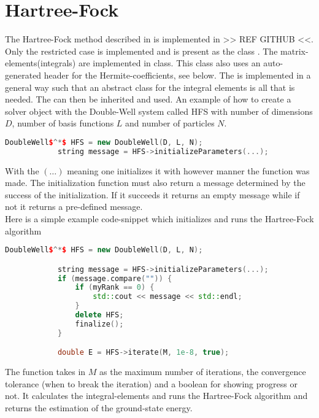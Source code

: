 \section{Hartree-Fock}
    The Hartree-Fock method described in  is implemented in
    >> REF GITHUB <<. Only the restricted case is implemented and is present as
    the class . The matrix-elements(integrals) are
    implemented in  class. This class also uses an
    auto-generated header for the Hermite-coefficients, see
     below. The  is
    implemented in a general way such that an abstract class for the integral
    elements is all that is needed. The  can then
    be inherited and used.  An example of how to create a solver object with
    the Double-Well system called HFS with number of dimensions $D$, number of
    basis functions $L$ and number of particles $N$.
        \begin{lstlisting}[language=C++, style=ccstyle]
            DoubleWell$^*$ HFS = new DoubleWell(D, L, N);
            string message = HFS->initializeParameters(...);
        \end{lstlisting}
    With the $(\dots)$ meaning one initializes it with however manner the
    function was made. The initialization function must also return a message
    determined by the success of the initialization. If it succeeds it returns
    an empty message while if not it returns a pre-defined message. \\ 
    Here is a simple example code-snippet which initializes and runs the
    Hartree-Fock algorithm
        \begin{lstlisting}[language=C++, style=ccstyle]
            DoubleWell$^*$ HFS = new DoubleWell(D, L, N);

            string message = HFS->initializeParameters(...);
            if (message.compare("")) {
                if (myRank == 0) {
                    std::cout << message << std::endl;
                }
                delete HFS;
                finalize();
            }

            double E = HFS->iterate(M, 1e-8, true);
        \end{lstlisting}
    The  function takes in $M$ as the maximum number of
    iterations, the convergence tolerance (when to break the iteration) and a
    boolean for showing progress or not. It calculates the integral-elements
    and runs the Hartree-Fock algorithm and returns the estimation of the
    ground-state energy.

